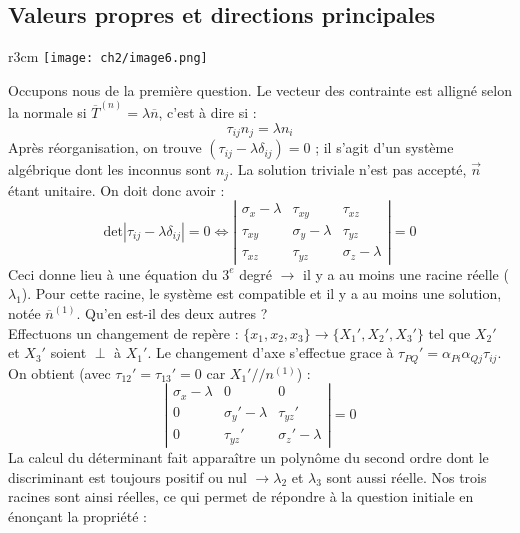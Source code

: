 \subsection{Valeurs propres et directions principales}
\begin{wrapfigure}[11]{r}{3cm}
	\texttt{[image: ch2/image6.png]}
\end{wrapfigure}
Occupons nous de la première question. Le vecteur des contrainte est alligné selon la normale si 
$\overline{T}^{(n)} = \lambda \overline{n}$, c'est à dire si :
\begin{equation}
	\tau_{ij}n_j = \lambda n_i
\end{equation}
Après réorganisation, on trouve $(\tau_{ij} - \lambda \delta_{ij}) = 0$ ; il s'agit d'un système
algébrique dont les inconnus sont $n_j$. La solution triviale n'est pas accepté, $\vec{n}$ étant 
unitaire. On doit donc avoir : 
\begin{equation}
	\text{det}|\tau_{ij} - \lambda \delta_{ij}|=0 \Leftrightarrow \left|\begin{array}{ccc}
	\sigma_x - \lambda      &\tau_{xy}              &\tau_{xz}\\
	\tau_{xy}               &\sigma_y-\lambda       &\tau_{yz}\\
	\tau_{xz}               &\tau_{yz}              &\sigma_z - \lambda
	\end{array}\right| = 0
\end{equation}
Ceci donne lieu à une équation du $3^e$ degré $\rightarrow$ il y a au moins une racine réelle ($\lambda_1$). 
Pour cette racine, le système est compatible et il y a au moins une solution, notée $\overline{n}^{(1)}$.
Qu'en est-il des deux autres ?\\
Effectuons un changement de repère : $\{x_1,x_2,x_3\}\rightarrow \{X_1',X_2',X_3'\}$ tel que 
$X_2'$ et $X_3'$ soient $\perp$ à $X_1'$. Le changement d'axe s'effectue grace à $\tau_{PQ}' = \alpha_{Pi}
\alpha_{Qj}\tau_{ij}$. On obtient (avec $\tau_{12}' = \tau_{13}' = 0$ car $X_1' // n^{(1)}$) :
\begin{equation}
	\left|\begin{array}{ccc}
	\sigma_x - \lambda      &0                      &0 \\
	0                       &\sigma_y'-\lambda       &\tau_{yz}'\\
	0                       &\tau_{yz}'              &\sigma_z' - \lambda
	\end{array}\right| = 0
\end{equation}
La calcul du déterminant fait apparaître un polynôme du second ordre dont le discriminant est toujours
positif ou nul $\rightarrow \lambda_2$ et $\lambda_3$ sont aussi réelle. Nos trois racines sont ainsi
réelles, ce qui permet de répondre à la question initiale en énonçant la propriété :\\
    
